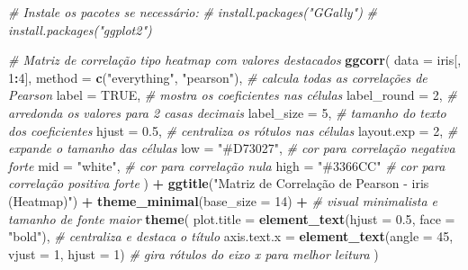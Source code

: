 \documentclass[
]{book}
\newenvironment{Shaded}{\begin{snugshade}}{\end{snugshade}}
\newcommand{\AttributeTok}[1]{\textcolor[rgb]{0.13,0.29,0.53}{#1}}
\newcommand{\CommentTok}[1]{\textcolor[rgb]{0.56,0.35,0.01}{\textit{#1}}}
\newcommand{\ConstantTok}[1]{\textcolor[rgb]{0.56,0.35,0.01}{#1}}
\newcommand{\DecValTok}[1]{\textcolor[rgb]{0.00,0.00,0.81}{#1}}
\newcommand{\FloatTok}[1]{\textcolor[rgb]{0.00,0.00,0.81}{#1}}
\newcommand{\FunctionTok}[1]{\textcolor[rgb]{0.13,0.29,0.53}{\textbf{#1}}}
\newcommand{\NormalTok}[1]{#1}
\newcommand{\SpecialCharTok}[1]{\textcolor[rgb]{0.81,0.36,0.00}{\textbf{#1}}}
\newcommand{\StringTok}[1]{\textcolor[rgb]{0.31,0.60,0.02}{#1}}
\begin{document}
\begin{Shaded}
\begin{Highlighting}[]
\CommentTok{\# Instale os pacotes se necessário:}
\CommentTok{\# install.packages("GGally")}
\CommentTok{\# install.packages("ggplot2")}

\CommentTok{\# Matriz de correlação tipo heatmap com valores destacados}
\FunctionTok{ggcorr}\NormalTok{(}
  \AttributeTok{data =}\NormalTok{ iris[, }\DecValTok{1}\SpecialCharTok{:}\DecValTok{4}\NormalTok{],}
  \AttributeTok{method =} \FunctionTok{c}\NormalTok{(}\StringTok{"everything"}\NormalTok{, }\StringTok{"pearson"}\NormalTok{), }\CommentTok{\# calcula todas as correlações de Pearson}
  \AttributeTok{label =} \ConstantTok{TRUE}\NormalTok{,             }\CommentTok{\# mostra os coeficientes nas células}
  \AttributeTok{label\_round =} \DecValTok{2}\NormalTok{,          }\CommentTok{\# arredonda os valores para 2 casas decimais}
  \AttributeTok{label\_size =} \DecValTok{5}\NormalTok{,           }\CommentTok{\# tamanho do texto dos coeficientes}
  \AttributeTok{hjust =} \FloatTok{0.5}\NormalTok{,              }\CommentTok{\# centraliza os rótulos nas células}
  \AttributeTok{layout.exp =} \DecValTok{2}\NormalTok{,           }\CommentTok{\# expande o tamanho das células}
  \AttributeTok{low =} \StringTok{"\#D73027"}\NormalTok{,          }\CommentTok{\# cor para correlação negativa forte}
  \AttributeTok{mid =} \StringTok{"white"}\NormalTok{,            }\CommentTok{\# cor para correlação nula}
  \AttributeTok{high =} \StringTok{"\#3366CC"}          \CommentTok{\# cor para correlação positiva forte}
\NormalTok{) }\SpecialCharTok{+}
  \FunctionTok{ggtitle}\NormalTok{(}\StringTok{"Matriz de Correlação de Pearson {-} iris (Heatmap)"}\NormalTok{) }\SpecialCharTok{+}
  \FunctionTok{theme\_minimal}\NormalTok{(}\AttributeTok{base\_size =} \DecValTok{14}\NormalTok{) }\SpecialCharTok{+} \CommentTok{\# visual minimalista e tamanho de fonte maior}
  \FunctionTok{theme}\NormalTok{(}
    \AttributeTok{plot.title =} \FunctionTok{element\_text}\NormalTok{(}\AttributeTok{hjust =} \FloatTok{0.5}\NormalTok{, }\AttributeTok{face =} \StringTok{"bold"}\NormalTok{), }\CommentTok{\# centraliza e destaca o título}
    \AttributeTok{axis.text.x =} \FunctionTok{element\_text}\NormalTok{(}\AttributeTok{angle =} \DecValTok{45}\NormalTok{, }\AttributeTok{vjust =} \DecValTok{1}\NormalTok{, }\AttributeTok{hjust =} \DecValTok{1}\NormalTok{) }\CommentTok{\# gira rótulos do eixo x para melhor leitura}
\NormalTok{  )}
\end{Highlighting}
\end{Shaded}
\end{document}
